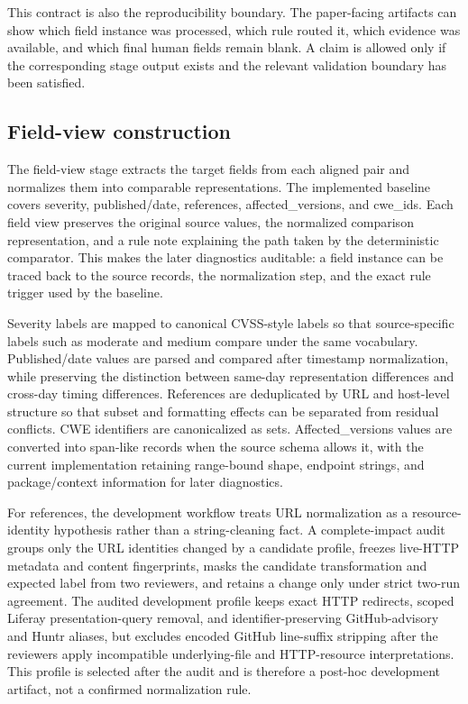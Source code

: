 This contract is also the reproducibility boundary. The paper-facing artifacts can show which field instance was processed, which rule routed it, which evidence was available, and which final human fields remain blank. A claim is allowed only if the corresponding stage output exists and the relevant validation boundary has been satisfied.

\subsection{Field-view construction}

The field-view stage extracts the target fields from each aligned pair and normalizes them into comparable representations. The implemented baseline covers severity, published/date, references, affected\_versions, and cwe\_ids. Each field view preserves the original source values, the normalized comparison representation, and a rule note explaining the path taken by the deterministic comparator. This makes the later diagnostics auditable: a field instance can be traced back to the source records, the normalization step, and the exact rule trigger used by the baseline.

Severity labels are mapped to canonical CVSS-style labels so that source-specific labels such as moderate and medium compare under the same vocabulary. Published/date values are parsed and compared after timestamp normalization, while preserving the distinction between same-day representation differences and cross-day timing differences. References are deduplicated by URL and host-level structure so that subset and formatting effects can be separated from residual conflicts. CWE identifiers are canonicalized as sets. Affected\_versions values are converted into span-like records when the source schema allows it, with the current implementation retaining range-bound shape, endpoint strings, and package/context information for later diagnostics.

For references, the development workflow treats URL normalization as a resource-identity hypothesis rather than a string-cleaning fact. A complete-impact audit groups only the URL identities changed by a candidate profile, freezes live-HTTP metadata and content fingerprints, masks the candidate transformation and expected label from two reviewers, and retains a change only under strict two-run agreement. The audited development profile keeps exact HTTP redirects, scoped Liferay presentation-query removal, and identifier-preserving GitHub-advisory and Huntr aliases, but excludes encoded GitHub line-suffix stripping after the reviewers apply incompatible underlying-file and HTTP-resource interpretations. This profile is selected after the audit and is therefore a post-hoc development artifact, not a confirmed normalization rule.

